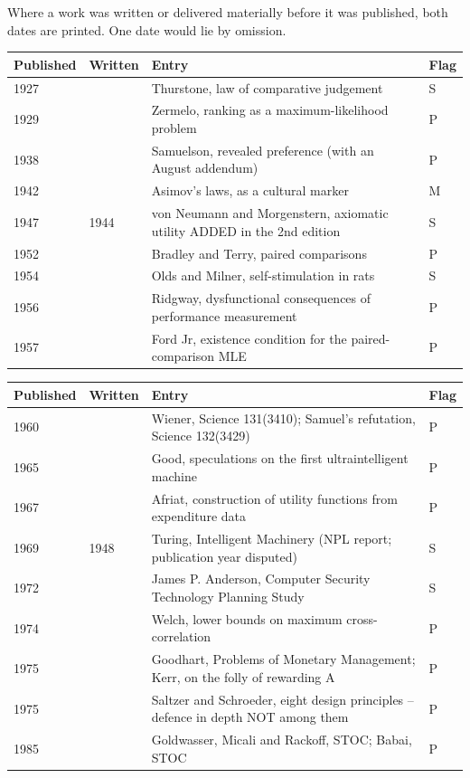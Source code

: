 Where a work was written or delivered materially before it was published, both dates are printed. One date would lie by omission.

\noindent

\noindent
\begin{tabularx}{\textwidth}{XlXl}
\toprule
Published & Written & Entry & Flag \\
\midrule
1927 &  & Thurstone, law of comparative judgement & S \\
1929 &  & Zermelo, ranking as a maximum-likelihood problem & P \\
1938 &  & Samuelson, revealed preference (with an August addendum) & P \\
1942 &  & Asimov's laws, as a cultural marker & M \\
1947 & 1944 & von Neumann and Morgenstern, axiomatic utility ADDED in the 2nd edition & S \\
1952 &  & Bradley and Terry, paired comparisons & P \\
1954 &  & Olds and Milner, self-stimulation in rats & S \\
1956 &  & Ridgway, dysfunctional consequences of performance measurement & P \\
1957 &  & Ford Jr, existence condition for the paired-comparison MLE & P \\
\bottomrule
\end{tabularx}
\par\medskip
\noindent
\begin{tabularx}{\textwidth}{XlXl}
\toprule
Published & Written & Entry & Flag \\
\midrule
1960 &  & Wiener, Science 131(3410); Samuel's refutation, Science 132(3429) & P \\
1965 &  & Good, speculations on the first ultraintelligent machine & P \\
1967 &  & Afriat, construction of utility functions from expenditure data & P \\
1969 & 1948 & Turing, Intelligent Machinery (NPL report; publication year disputed) & S \\
1972 &  & James P. Anderson, Computer Security Technology Planning Study & S \\
1974 &  & Welch, lower bounds on maximum cross-correlation & P \\
1975 &  & Goodhart, Problems of Monetary Management; Kerr, on the folly of rewarding A & P \\
1975 &  & Saltzer and Schroeder, eight design principles -- defence in depth NOT among them & P \\
1985 &  & Goldwasser, Micali and Rackoff, STOC; Babai, STOC & P \\
\bottomrule
\end{tabularx}
